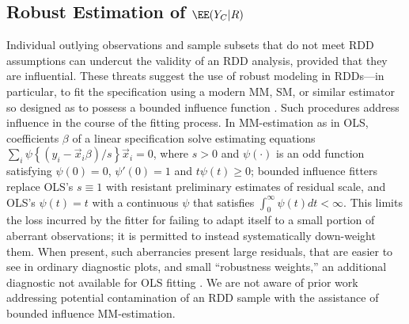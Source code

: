 \subsection{Robust Estimation of $\EE (Y_{C}| R)$}
\label{sec:robust-altern-ordin}

Individual outlying observations and sample subsets that do not meet
RDD assumptions can undercut the validity of an RDD analysis, provided
that they are influential.
These threats suggest the use of robust modeling in RDDs---in
particular, to fit the
 specification using a modern MM,  SM, or similar estimator so designed
 as to possess a bounded influence function
 \citep{yohaiZamar1997locallyrobustMestimates}.
Such procedures address influence
 in the course of the fitting process.
 In MM-estimation as in OLS,
coefficients $\beta$ of a linear specification solve estimating equations
$\sum_{i} \psi\left\{ ({y}_{i} -
\vec{x}_{i}\beta)/s \right\} \vec{x}_{i} =0$, where $s>0$ and
$\psi(\cdot)$ is an odd function satisfying $\psi(0)=0$,
$\psi'(0)=1$ and $t\psi(t)\geq 0$; bounded influence fitters replace OLS's $s\equiv 1$ with resistant preliminary
estimates of residual scale, and OLS's $\psi(t) = t$ with a continuous $\psi$
that satisfies $\int_{0}^{\infty}\psi(t)dt < \infty$. This limits
the loss incurred by the fitter for failing to adapt itself to a small
portion of aberrant observations;
it is permitted to instead systematically down-weight them. When
present, such aberrancies present large residuals, that are easier to
see in ordinary diagnostic plots, and small
``robustness weights,'' an additional diagnostic not available for OLS fitting
\citep{maronna2006robust}.  We are not aware of prior work addressing
potential contamination of an RDD sample with the assistance of
bounded influence MM-estimation.

